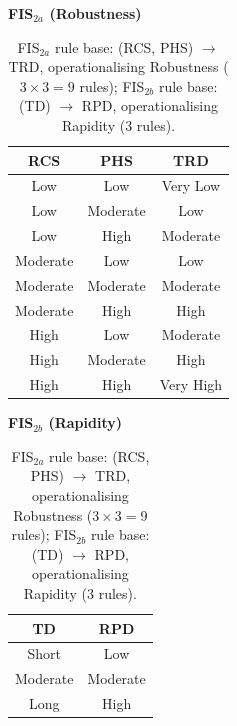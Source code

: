 \documentclass[applsci,article,submit,moreauthors,pdftex]{Definitions/mdpi}
\begin{document}
\begin{table}[!ht]
\centering\footnotesize
\setlength{\tabcolsep}{6pt}
\caption{FIS$_{2a}$ rule base: (RCS, PHS) $\to$ TRD, operationalising
Robustness ($3 \times 3 = 9$ rules); FIS$_{2b}$ rule base:
(TD) $\to$ RPD, operationalising Rapidity (3 rules).}
\label{tab:rules-fis2}
\begin{minipage}[t]{0.55\textwidth}\centering
\textbf{FIS$_{2a}$ (Robustness)}\\[2pt]
\begin{tabular}{ccc}
\toprule
RCS & PHS & TRD \\
\midrule
Low & Low & Very Low \\
Low & Moderate & Low \\
Low & High & Moderate \\
Moderate & Low & Low \\
Moderate & Moderate & Moderate \\
Moderate & High & High \\
High & Low & Moderate \\
High & Moderate & High \\
High & High & Very High \\
\bottomrule
\end{tabular}
\end{minipage}\hfill
\begin{minipage}[t]{0.4\textwidth}\centering
\textbf{FIS$_{2b}$ (Rapidity)}\\[2pt]
\begin{tabular}{cc}
\toprule
TD & RPD \\
\midrule
Short & Low \\
Moderate & Moderate \\
Long & High \\
\bottomrule
\end{tabular}
\end{minipage}
\end{table}
\end{document}
